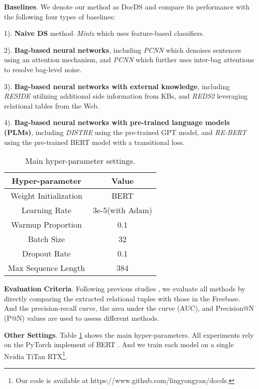 \documentclass[11pt,a4paper]{article}
\begin{document}
  \textbf{Baselines}.
  We denote our method as DocDS and compare its performance with the following four types of baselines:
  
  1). \textbf{Naive DS} method--\emph{Mintz}\cite{mintz_distant_2009} which uses feature-based classifiers.
  
  2). \textbf{Bag-based neural networks}, including \emph{PCNN}\cite{lin_neural_2016} which denoises sentences using an attention mechanism, and \emph{PCNN}\cite{ye_distant_2019} which further uses inter-bag attentions to resolve bag-level noise.
  
  3). \textbf{Bag-based neural networks with external knowledge}, including \emph{RESIDE}\cite{vashishth_reside_2018} utilizing additional side information from KBs, and \emph{REDS2} \cite{deng_leveraging_2019} leveraging relational tables from the Web.
  
  4). \textbf{Bag-based neural networks with pre-trained language models (PLMs)}, including \emph{DISTRE} \cite{alt_finetuning_2019} using the pre-trained GPT model, and \emph{RE-BERT}\cite{wu_practical_2020} using the pre-trained BERT model with a transitional loss.
  
  \begin{table}[!t]
    \setlength{\belowcaptionskip}{-1em}
    \centering
      \begin{tabular}{cc}
      \toprule
      \textbf{Hyper-parameter} & \textbf{Value} \\
      \midrule
      Weight Initialization & BERT \\
      Learning Rate & 3e-5(with Adam) \\
      Warmup Proportion  & 0.1 \\
      Batch Size & 32 \\
      Dropout Rate & 0.1 \\
      Max Sequence Length & 384 \\
      \bottomrule
      \end{tabular}\caption{Main hyper-parameter settings.}
    \label{tab:parameter}\end{table}

  \textbf{Evaluation Criteria}.
  Following previous studies \cite{lin_neural_2016,deng_leveraging_2019}, we evaluate all methods by directly comparing the extracted relational tuples with those in the Freebase.
  And the precision-recall curve, the area under the curve (AUC), and Precision@N (P@N) values are used to assess different methods.
  
  \textbf{Other Settings}.
  Table \ref{tab:parameter} shows the main hyper-parameters.
  All experiments rely on the PyTorch implement of BERT \cite{wolf_huggingfaces_2019}.
  And we train each model on a single Nvidia TiTan RTX\footnote{Our code is available at https://www.github.com/lingyongyan/docds.}.
  
\end{document}
